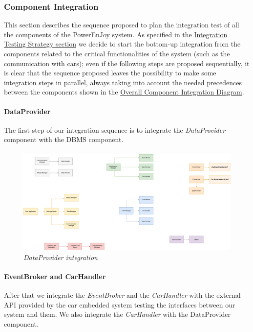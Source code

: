 \subsubsection{Component Integration}
This section describes the sequence proposed to plan the integration test of all the components of the PowerEnJoy system. As specified in the \hyperref[sec:intStrategy]{Integration Testing Strategy section} we decide to start the bottom-up integration from the components related to the critical functionalities of the system (such as the communication with cars); even if the following steps are proposed sequentially, it is clear that the sequence proposed leaves the possibility to make some integration steps in parallel, always taking into account the needed precedences between the components shown in the \hyperref[sec:overallPrecedences]{Overall Component Integration Diagram}.

\paragraph{DataProvider} 
The first step of our integration sequence is to integrate the \emph{DataProvider} component with the DBMS component.
\paragraph{}

		\begin{figure}[h]
			\centering
			\includegraphics[width=0.6\linewidth]{img/Integration1}
			\caption{
				\label{fig:dataProvider} 
				\emph{DataProvider integration}
			}
		\end{figure}

\paragraph{EventBroker and CarHandler} 
After that we integrate the \emph{EventBroker} and the \emph{CarHandler} with the external API provided by the car embedded system testing the interfaces between our system and them. We also integrate the \emph{CarHandler} with the {DataProvider} component.\\
